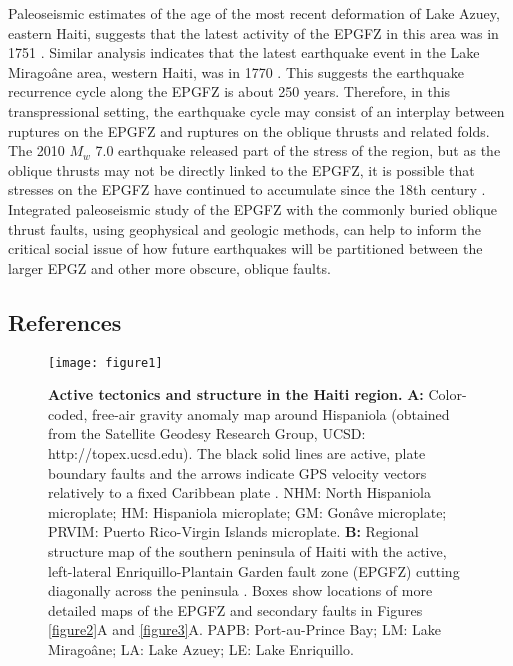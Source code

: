 \documentclass[man,natbib]{apa6}
\begin{document}
Paleoseismic estimates of the age of the most recent deformation of Lake Azuey, eastern Haiti, suggests that the latest activity of the EPGFZ in this area was in 1751 \citep{prentice2010seismic,bakun2012significant}. Similar analysis indicates that the latest earthquake event in the Lake Mirago\^ane area, western Haiti, was in 1770 \citep{bakun2012significant}. This suggests the earthquake recurrence cycle along the EPGFZ is about 250 years. Therefore, in this transpressional setting, the earthquake cycle may consist of an interplay between ruptures on the EPGFZ and ruptures on the oblique thrusts and related folds. The 2010 $M_w$ 7.0 earthquake released part of the stress of the region, but as the oblique thrusts may not be directly linked to the EPGFZ, it is possible that stresses on the EPGFZ have continued to accumulate since the 18th century \citep{prentice2010seismic}. Integrated paleoseismic study of the EPGFZ with the commonly buried oblique thrust faults, using geophysical and geologic methods, can help to inform the critical social issue of how future earthquakes will be partitioned between the larger EPGZ and other more obscure, oblique faults.

\subsection{References}
%
%



\begin{figure}
\centering
\texttt{[image: figure1]}
\caption{\textbf{Active tectonics and structure in the Haiti region.} \textbf{A:}
Color-coded, free-air gravity anomaly map around Hispaniola (obtained from the Satellite Geodesy Research Group, UCSD: http://topex.ucsd.edu). The black solid lines are active, plate boundary faults and the arrows indicate GPS velocity vectors relatively to a fixed Caribbean plate \citep{calais2010transpressional}. NHM: North Hispaniola microplate; HM: Hispaniola microplate; GM: Gon\^ave microplate; PRVIM: Puerto Rico-Virgin Islands microplate. \textbf{B:} Regional structure map of the southern peninsula of Haiti with the active, left-lateral Enriquillo-Plantain Garden fault zone (EPGFZ) cutting diagonally across the peninsula \citep{mann1984subaerially,mann1995actively}. Boxes show locations of more detailed maps of the EPGFZ and secondary faults in Figures \ref{figure2}A and \ref{figure3}A. PAPB: Port-au-Prince Bay; LM: Lake Mirago\^ane; LA: Lake Azuey; LE: Lake Enriquillo.}
\label{figure1}
\end{figure}
\end{document}
